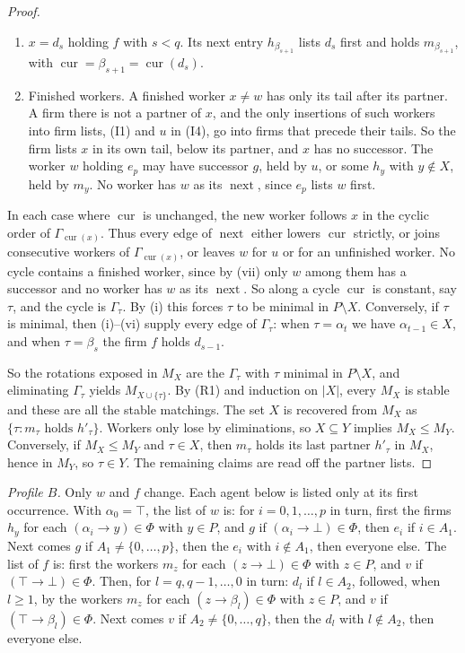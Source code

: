 \documentclass[11pt]{amsart}
\theoremstyle{definition}
\theoremstyle{remark}
\newcommand{\cur}{\operatorname{cur}}
\newcommand{\nxt}{\operatorname{next}}
\begin{document}
\begin{proof}
\begin{enumerate}[label=(\roman*)]
\item $x=d_s$ holding $f$ with $s<q$. Its next entry $h_{\beta_{s+1}}$ lists $d_s$ first and holds $m_{\beta_{s+1}}$, with $\cur=\beta_{s+1}=\cur(d_s)$.
\item Finished workers. A finished worker $x\ne w$ has only its tail after its partner. A firm there is not a partner of $x$, and the only insertions of such workers into firm lists, (I1) and $u$ in (I4), go into firms that precede their tails. So the firm lists $x$ in its own tail, below its partner, and $x$ has no successor. The worker $w$ holding $e_p$ may have successor $g$, held by $u$, or some $h_y$ with $y\notin X$, held by $m_y$. No worker has $w$ as its $\nxt$, since $e_p$ lists $w$ first.
\end{enumerate}
In each case where $\cur$ is unchanged, the new worker follows $x$ in the cyclic order of $\Gamma_{\cur(x)}$. Thus every edge of $\nxt$ either lowers $\cur$ strictly, or joins consecutive workers of $\Gamma_{\cur(x)}$, or leaves $w$ for $u$ or for an unfinished worker. No cycle contains a finished worker, since by (vii) only $w$ among them has a successor and no worker has $w$ as its $\nxt$. So along a cycle $\cur$ is constant, say $\tau$, and the cycle is $\Gamma_\tau$. By (i) this forces $\tau$ to be minimal in $P\setminus X$. Conversely, if $\tau$ is minimal, then (i)--(vi) supply every edge of $\Gamma_\tau$: when $\tau=\alpha_t$ we have $\alpha_{t-1}\in X$, and when $\tau=\beta_s$ the firm $f$ holds $d_{s-1}$.

So the rotations exposed in $M_X$ are the $\Gamma_\tau$ with $\tau$ minimal in $P\setminus X$, and eliminating $\Gamma_\tau$ yields $M_{X\cup\{\tau\}}$. By (R1) and induction on $|X|$, every $M_X$ is stable and these are all the stable matchings. The set $X$ is recovered from $M_X$ as $\{\tau: m_\tau\text{ holds }h'_\tau\}$. Workers only lose by eliminations, so $X\subseteq Y$ implies $M_X\le M_Y$. Conversely, if $M_X\le M_Y$ and $\tau\in X$, then $m_\tau$ holds its last partner $h'_\tau$ in $M_X$, hence in $M_Y$, so $\tau\in Y$. The remaining claims are read off the partner lists.
\end{proof}

\emph{Profile $B$.} Only $w$ and $f$ change. Each agent below is listed only at its first occurrence. With $\alpha_0=\top$, the list of $w$ is: for $i=0,1,\dots,p$ in turn, first the firms $h_y$ for each $(\alpha_i\to y)\in\Phi$ with $y\in P$, and $g$ if $(\alpha_i\to\bot)\in\Phi$, then $e_i$ if $i\in A_1$. Next comes $g$ if $A_1\ne\{0,\dots,p\}$, then the $e_i$ with $i\notin A_1$, then everyone else. The list of $f$ is: first the workers $m_z$ for each $(z\to\bot)\in\Phi$ with $z\in P$, and $v$ if $(\top\to\bot)\in\Phi$. Then, for $l=q,q-1,\dots,0$ in turn: $d_l$ if $l\in A_2$, followed, when $l\ge1$, by the workers $m_z$ for each $(z\to\beta_l)\in\Phi$ with $z\in P$, and $v$ if $(\top\to\beta_l)\in\Phi$. Next comes $v$ if $A_2\ne\{0,\dots,q\}$, then the $d_l$ with $l\notin A_2$, then everyone else.
\end{document}

